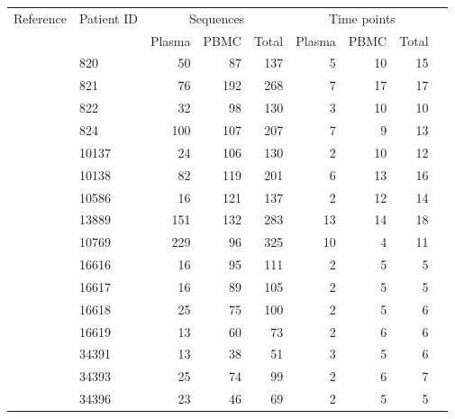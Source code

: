 \documentclass[12pt]{article}
\begin{document}
\begin{table}[!ht]
\def\arraystretch{1.3}%
\begin{center}
\begin{tabular}{llrrrrrrr} 

Reference & Patient ID & \multicolumn{3}{c}{Sequences} & \multicolumn{3}{c}{Time points} \\
 &  & Plasma & PBMC & Total & Plasma & PBMC & Total\\
\hline
\cite{Shankarappa99} & 820 &       50 &       87 &      137 &        5 &       10 &       15  \\
& 821 &      76 &      192 &      268 &        7 &       17 &       17 \\ 
& 822 &      32 &       98 &      130 &        3 &       10 &       10 \\ 
& 824 &     100 &      107 &      207 &        7 &        9 &       13 \\
& 10137 &     24 &      106 &      130 &        2 &       10 &       12 \\
& 10138 &     82 &      119 &      201 &        6 &       13 &       16 \\
& 10586 &     16 &      121 &      137 &        2 &       12 &       14  \\ 
& 13889 &    151 &      132 &      283 &       13 &       14 &       18 \\
\cite{Fischer04} & 10769 &    229 &       96 &      325 &       10 &        4 &       11 \\ 
\cite{Llewellyn06} & 16616 &     16 &       95 &      111 &        2 &        5 &        5 \\
& 16617 &     16 &       89 &      105 &        2 &        5 &        5 \\
& 16618 &     25 &       75 &      100 &        2 &        5 &        6 \\
& 16619 &     13 &       60 &       73 &        2 &        6 &        6 \\
\cite{Novitsky09}%
& 34391 &     13 &       38 &       51 &        3 &        5 &        6 \\
& 34393 &     25 &       74 &       99 &        2 &        6 &        7 \\
& 34396 &      23 &       46 &       69 &        2 &        5 &        5 \\

\end{tabular}
\end{center}
\end{table}
\end{document}
